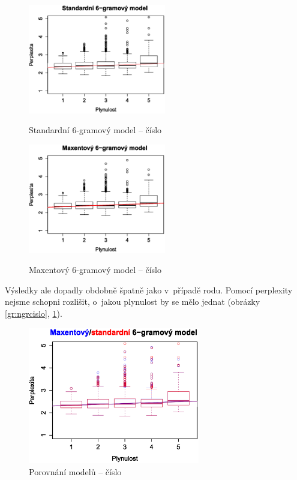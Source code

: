\documentclass[12pt,a4paper]{report}
\begin{document}
\begin{figure}[!htb]
\begin{center}
  \centering\includegraphics[width=60mm]{./grafy/morf/ngram/cislo.svg.eps}
  \caption{Standardní 6-gramový model -- číslo}\label{gr:ngrcislo}
\endminipage\quad
{}
  \centering\includegraphics[width=60mm]{./grafy/morf/maxent/cislo.svg.eps}	
  \caption{Maxentový 6-gramový model -- číslo}\label{gr:maxcislo}
\endminipage
\end{center}
\end{figure}


Výsledky ale dopadly obdobně špatně jako v~případě rodu. Pomocí perplexity nejsme schopni rozlišit, o~jakou plynulost by se mělo jednat (obrázky \ref{gr:ngrcislo}, \ref{gr:maxcislo}).

\begin{figure}[!htbp]
\begin{center}
	\centering
	\includegraphics[width=75mm]{./grafy/morf/porovnani/cislo.svg.eps}
	\caption{Porovnání modelů -- číslo}\label{gr:porcislo}
\endminipage
\end{center}
\end{figure}
\end{document}
